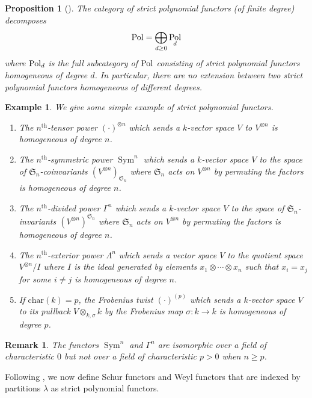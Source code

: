 \documentclass[11pt]{amsart}
\numberwithin{subsection}{section}
\numberwithin{figure}{section}
\numberwithin{table}{section}
\theoremstyle{1}
\newtheorem{proposition}[theorem]{Proposition}
\theoremstyle{2}
\newtheorem{example}[theorem]{Example}
\newtheorem{rmrk}[theorem]{Remark}
\DeclareMathOperator{\Sym}{Sym}
\DeclareMathOperator{\Pol}{\normalfont \textsf{Pol}}
\begin{document}
\begin{proposition}[{\cite[Proposition 2.6]{MR1427618}}]
The category of strict polynomial functors (of finite degree) decomposes
\begin{equation*}
\Pol = \bigoplus_{d \geq 0} \Pol_d
\end{equation*}
where $\Pol_d$ is the full subcategory of $\Pol$ consisting of strict polynomial functors homogeneous of degree $d$. In particular, there are no extension between two strict polynomial functors homogeneous of different degrees.
\end{proposition}
\begin{example}
We give some simple example of strict polynomial functors.
\begin{enumerate}
\item The $n^{\text{th}}$-tensor power $(\cdot)^{\otimes n}$ which sends a $k$-vector space $V$ to $V^{\otimes n}$ is homogeneous of degree $n$.
\item The $n^{\text{th}}$-symmetric power $\Sym^n$ which sends a $k$-vector space $V$ to the space of $\mathfrak{S}_n$-coinvariants $(V^{\otimes n})_{\mathfrak{S}_n}$ where $\mathfrak{S}_n$ acts on $V^{\otimes n}$ by permuting the factors is homogeneous of degree $n$.
\item The $n^{\text{th}}$-divided power $\Gamma^n$ which sends a $k$-vector space $V$ to the space of $\mathfrak{S}_n$-invariants $(V^{\otimes n})^{\mathfrak{S}_n}$ where $\mathfrak{S}_n$ acts on $V^{\otimes n}$ by permuting the factors is homogeneous of degree $n$.
\item The $n^{\text{th}}$-exterior power $\Lambda^n$ which sends a vector space $V$ to the quotient space $V^{\otimes n}/I$ where $I$ is the ideal generated by elements $x_1\otimes \cdots \otimes x_n$ such that $x_i = x_j$ for some $i \neq j$ is homogeneous of degree $n$.
\item If $\text{char}(k)= p$, the Frobenius twist $(\cdot)^{(p)}$ which sends a $k$-vector space $V$ to its pullback $V \otimes_{k,\sigma} k$ by the Frobenius map $\sigma : k \rightarrow k$ is homogeneous of degree $p$.
\end{enumerate}
\end{example}
\begin{rmrk}
The functors $\Sym^n$ and $\Gamma^n$ are isomorphic over a field of characteristic $0$ but not over a field of characteristic $p>0$ when $n\geq p$.
\end{rmrk}
\vspace*{0.2cm}
Following \cite{MR658729}, we now define Schur functors and Weyl functors that are indexed by partitions $\lambda$ as strict polynomial functors. 
\end{document}
